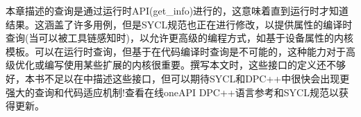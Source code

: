 本章描述的查询是通过运行时API(get\_info)进行的，这意味着直到运行时才知道结果。这涵盖了许多用例，但是SYCL规范也正在进行修改，以提供属性的编译时查询(当可以被工具链感知时)，以允许更高级的编程方式，如基于设备属性的内核模板。可以在运行时查询，但基于在代码编译时查询是不可能的，这种能力对于高级优化或编写使用某些扩展的内核很重要。撰写本文时，这些接口的定义还不够好，本书不足以在中描述这些接口，但可以期待SYCL和DPC++中很快会出现更强大的查询和代码适应机制!查看在线oneAPI DPC++语言参考和SYCL规范以获得更新。\par